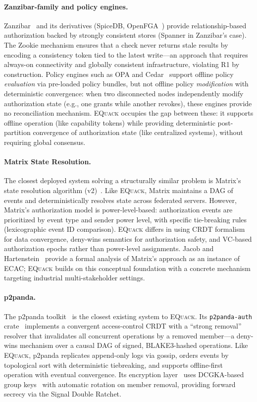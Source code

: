 \documentclass[10pt,journal,compsoc]{IEEEtran}
\newcommand{\equack}{\textsc{EQuack}}
\begin{document}
\paragraph{Zanzibar-family and policy engines.}
Zanzibar~\cite{zanzibar2019} and its derivatives (SpiceDB, OpenFGA~\cite{openfga}) provide relationship-based authorization backed by strongly consistent stores (Spanner in Zanzibar's case). The Zookie mechanism ensures that a check never returns stale results by encoding a consistency token tied to the latest write---an approach that requires always-on connectivity and globally consistent infrastructure, violating R1 by construction. Policy engines such as OPA and Cedar~\cite{cutler2024cedar} support offline policy \emph{evaluation} via pre-loaded policy bundles, but not offline policy \emph{modification} with deterministic convergence: when two disconnected nodes independently modify authorization state (e.g., one grants while another revokes), these engines provide no reconciliation mechanism. \equack{} occupies the gap between these: it supports offline operation (like capability tokens) while providing deterministic post-partition convergence of authorization state (like centralized systems), without requiring global consensus.

\paragraph{Matrix State Resolution.}
The closest deployed system solving a structurally similar problem is Matrix's state resolution algorithm (v2)~\cite{matrix_stateresv2}. Like \equack{}, Matrix maintains a DAG of events and deterministically resolves state across federated servers. However, Matrix's authorization model is power-level-based: authorization events are prioritized by event type and sender power level, with specific tie-breaking rules (lexicographic event ID comparison). \equack{} differs in using CRDT formalism for data convergence, deny-wins semantics for authorization safety, and VC-based authorization epochs rather than power-level assignments. Jacob and Hartenstein~\cite{jacob2024eventuallyac} provide a formal analysis of Matrix's approach as an instance of ECAC; \equack{} builds on this conceptual foundation with a concrete mechanism targeting industrial multi-stakeholder settings.

\paragraph{p2panda.}
The p2panda toolkit~\cite{p2panda2024} is the closest existing
system to \equack{}. Its \texttt{p2panda-auth}
crate~\cite{p2panda_auth2025} implements a convergent access-control
CRDT with a ``strong removal'' resolver that invalidates all
concurrent operations by a removed member---a deny-wins mechanism
over a causal DAG of signed, BLAKE3-hashed operations. Like \equack{},
p2panda replicates append-only logs via gossip, orders events by
topological sort with deterministic tiebreaking, and supports
offline-first operation with eventual convergence. Its encryption
layer~\cite{p2panda_encryption2025} uses DCGKA-based group
keys~\cite{weidner2021dcgka} with automatic rotation on member
removal, providing forward secrecy via the Signal Double Ratchet.
\end{document}
